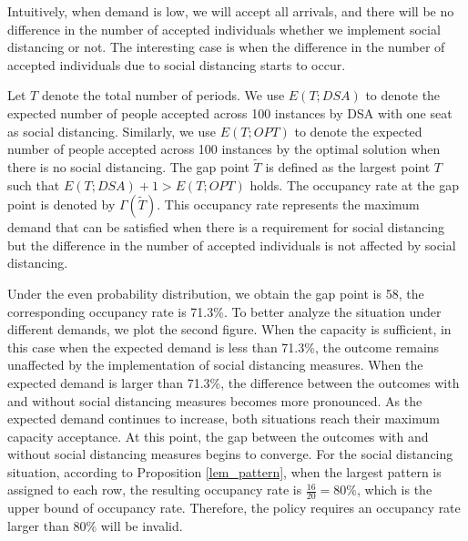 Intuitively, when demand is low, we will accept all arrivals, and there will be no difference in the number of accepted individuals whether we implement social distancing or not. The interesting case is when the difference in the number of accepted individuals due to social distancing starts to occur.

Let $T$ denote the total number of periods. We use $E(T; DSA)$ to denote the expected number of people accepted across 100 instances by DSA with one seat as social distancing. Similarly, we use $E(T; OPT)$ to denote the expected number of people accepted across 100 instances by the optimal solution when there is no social distancing. The gap point $\tilde{T}$ is defined as the largest point $T$ such that $E(T; DSA)+1 > E(T; OPT)$ holds. The occupancy rate at the gap point is denoted by $\Gamma(\tilde{T})$. This occupancy rate represents the maximum demand that can be satisfied when there is a requirement for social distancing but the difference in the number of accepted individuals is not affected by social distancing.


Under the even probability distribution, we obtain the gap point is 58, the corresponding occupancy rate is 71.3\%. To better analyze the situation under different demands, we plot the second figure. When the capacity is sufficient, in this case when the expected demand is less than 71.3\%, the outcome remains unaffected by the implementation of social distancing measures. When the expected demand is larger than 71.3\%, the difference between the outcomes with and without social distancing measures becomes more pronounced. As the expected demand continues to increase, both situations reach their maximum capacity acceptance. At this point, the gap between the outcomes with and without social distancing measures begins to converge. For the social distancing situation, according to Proposition \ref{lem_pattern}, when the largest pattern is assigned to each row, the resulting occupancy rate is $\frac{16}{20} = 80\%$, which is the upper bound of occupancy rate. Therefore, the policy requires an occupancy rate larger than 80\% will be invalid.

